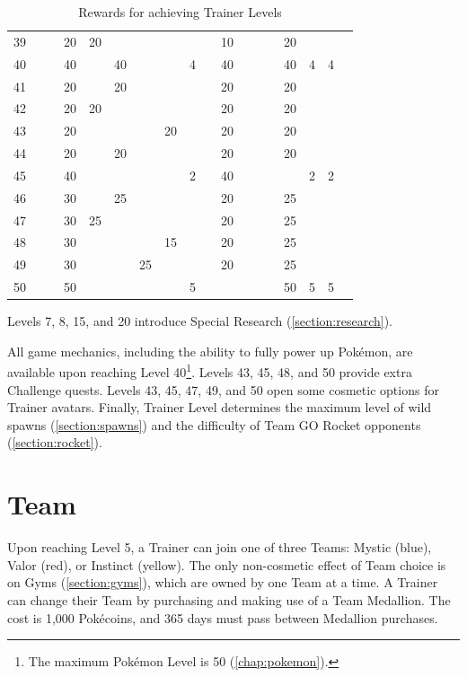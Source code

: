 \begin{table}[t]
\begin{center}
\begin{tabular}{r|g c g c g c g c g c g c g c g c g}
   39 &    &    & 20 & 20 &    &    &    &   &    & 10 &    &    &    & 20 &   &   & \\
   40 &    &    & 40 &    & 40 &    &    & 4 &    & 40 &    &    &    & 40 & 4 & 4 & \\
   41 &    &    & 20 &    & 20 &    &    &   &    & 20 &    &    &    & 20 &   &   & \\
   42 &    &    & 20 & 20 &    &    &    &   &    & 20 &    &    &    & 20 &   &   & \\
   43 &    &    & 20 &    &    &    & 20 &   &    & 20 &    &    &    & 20 &   &   & \\
   44 &    &    & 20 &    & 20 &    &    &   &    & 20 &    &    &    & 20 &   &   & \\
   45 &    &    & 40 &    &    &    &    & 2 &    & 40 &    &    &    &    & 2 & 2 & \\
   46 &    &    & 30 &    & 25 &    &    &   &    & 20 &    &    &    & 25 &   &   & \\
   47 &    &    & 30 & 25 &    &    &    &   &    & 20 &    &    &    & 25 &   &   & \\
   48 &    &    & 30 &    &    &    & 15 &   &    & 20 &    &    &    & 25 &   &   & \\
   49 &    &    & 30 &    &    & 25 &    &   &    & 20 &    &    &    & 25 &   &   & \\
   50 &    &    & 50 &    &    &    &    & 5 &    &    &    &    &    & 50 & 5 & 5 & \\
\end{tabular}
\caption{Rewards for achieving Trainer Levels}
\label{table:levelitems}
\end{center}
\end{table}
Levels 7, 8, 15, and 20 introduce Special Research (\autoref{section:research}).

All game mechanics, including the ability to fully power up Pokémon,
 are available upon reaching Level 40\footnote{The maximum Pokémon Level is 50 (\autoref{chap:pokemon}).}.
Levels 43, 45, 48, and 50 provide extra Challenge quests.
Levels 43, 45, 47, 49, and 50 open some cosmetic options for Trainer avatars.
Finally, Trainer Level determines the maximum level of wild spawns
  (\autoref{section:spawns}) and the difficulty of Team GO Rocket
  opponents (\autoref{section:rocket}).

\section{Team}
Upon reaching Level 5, a Trainer can join one of three Teams: Mystic (blue),
  Valor (red), or Instinct (yellow).
The only non-cosmetic effect of Team choice is on Gyms (\autoref{section:gyms}), which
  are owned by one Team at a time.
A Trainer can change their Team by purchasing and making use of a Team Medallion.
The cost is 1,000 Pokécoins, and 365 days must pass between Medallion purchases.

